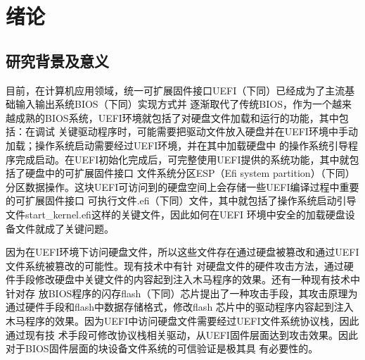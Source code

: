 %
%
\chapter{绪论}
\label{cha:introduction}
%
%
\section{研究背景及意义}
目前，在计算机应用领域，统一可扩展固件接口UEFI（下同）已经成为了主流基础输入输出系统BIOS（下同）实现方式并
逐渐取代了传统BIOS，作为一个越来越成熟的BIOS系统，UEFI环境就包括了对硬盘文件加载和运行的功能，其中包括：在调试
关键驱动程序时，可能需要把驱动文件放入硬盘并在UEFI环境中手动加载；操作系统启动需要经过UEFI环境，并在其中加载硬盘中
的操作系统引导程序完成启动。在UEFI初始化完成后，可完整使用UEFI提供的系统功能，其中就包括了硬盘中的可扩展固件接口
文件系统分区ESP（Efi system partition）（下同）分区数据操作。这块UEFI可访问到的硬盘空间上会存储一些UEFI编译过程中重要的可扩展固件接口
可执行文件.efi（下同）文件，其中就包括了操作系统启动引导文件start\_kernel.efi这样的关键文件，因此如何在UEFI
环境中安全的加载硬盘设备文件就成了关键问题。
\par 因为在UEFI环境下访问硬盘文件，所以这些文件存在通过硬盘被篡改和通过UEFI文件系统被篡改的可能性。现有技术中有针
对硬盘文件的硬件攻击方法，通过硬件手段修改硬盘中关键文件的内容起到注入木马程序的效果。还有一种现有技术中针对存
放BIOS程序的闪存flash（下同）芯片提出了一种攻击手段，其攻击原理为通过硬件手段和flash中数据存储格式，修改flash
芯片中的驱动程序内容起到注入木马程序的效果。因为UEFI中访问硬盘文件需要经过UEFI文件系统协议栈，因此通过现有技
术手段可修改协议栈相关驱动，从UEFI固件层面达到攻击效果。因此对于BIOS固件层面的块设备文件系统的可信验证是极其具
有必要性的。

%
%
